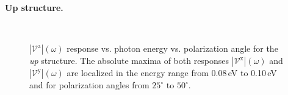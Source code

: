 \documentclass[prb,11pt,tightenlines,twocolumn,aps]{revtex4-1}
\begin{document}
\textbf{Up structure.}
\begin{figure}[t]
    \centering
    \\
    
    \caption{$|\mathcal{V}^{\mathrm{a}}|(\omega)$ response vs. photon energy vs.
    polarization angle for the \emph{up} structure. The absolute maxima of both
    responses $|\mathcal{V}^{\mathrm{x}}|(\omega)$ and
    $|\mathcal{V}^{\mathrm{y}}|(\omega)$ are localized in the energy
    range from 0.08\,eV to 0.10\,eV and for polarization angles from
    $25^{\circ}$ to $50^{\circ}$.}
    \label{fig:up-3d-vva-1}
\end{figure}
\end{document}
